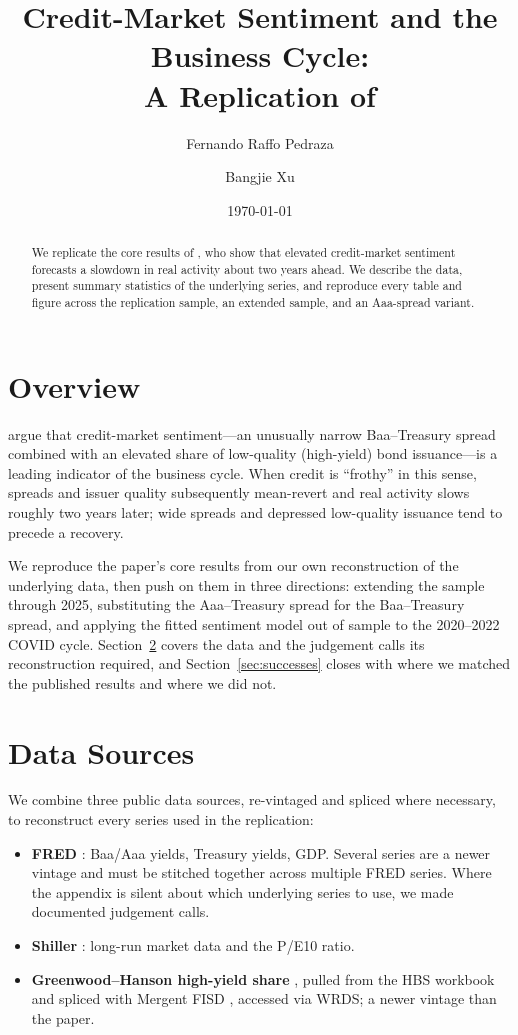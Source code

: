 \documentclass[11pt]{article}
\title{Credit-Market Sentiment and the Business Cycle:\\ A Replication of \citet{lopezsalido2017credit}}
\author{Fernando Raffo Pedraza \and Bangjie Xu}
\date{\today}
\begin{document}
\maketitle

\begin{abstract}
We replicate the core results of \citet{lopezsalido2017credit}, who show that elevated
credit-market sentiment forecasts a slowdown in real activity about two years ahead. We
describe the data, present summary statistics of the underlying series, and reproduce every
table and figure across the replication sample, an extended sample, and an Aaa-spread variant.
\end{abstract}

\section{Overview}

\citet{lopezsalido2017credit} argue that credit-market sentiment---an unusually narrow
Baa--Treasury spread combined with an elevated share of low-quality (high-yield) bond
issuance---is a leading indicator of the business cycle. When credit is ``frothy'' in this
sense, spreads and issuer quality subsequently mean-revert and real activity slows roughly two
years later; wide spreads and depressed low-quality issuance tend to precede a recovery.

We reproduce the paper's core results from our own reconstruction of the underlying data, then
push on them in three directions: extending the sample through 2025, substituting the
Aaa--Treasury spread for the Baa--Treasury spread, and applying the fitted sentiment model out
of sample to the 2020--2022 COVID cycle. Section~\ref{sec:data} covers the data and the
judgement calls its reconstruction required, and Section~\ref{sec:successes} closes with where
we matched the published results and where we did not.

\section{Data Sources}
\label{sec:data}

We combine three public data sources, re-vintaged and spliced where necessary, to reconstruct
every series used in the replication:

\begin{itemize}
\item \textbf{FRED} \citep{fred}: Baa/Aaa yields, Treasury yields, GDP. Several series are a
newer vintage and must be stitched together across multiple FRED series. Where the appendix is
silent about which underlying series to use, we made documented judgement calls.
\item \textbf{Shiller} \citep{shiller2015data}: long-run market data and the P/E10 ratio.
\item \textbf{Greenwood--Hanson high-yield share} \citep{greenwood2013issuer}, pulled from the
HBS workbook \citep{hbsics} and spliced with Mergent FISD \citep{mergentfisd}, accessed via
WRDS; a newer vintage than the paper.
\end{itemize}
\end{document}
